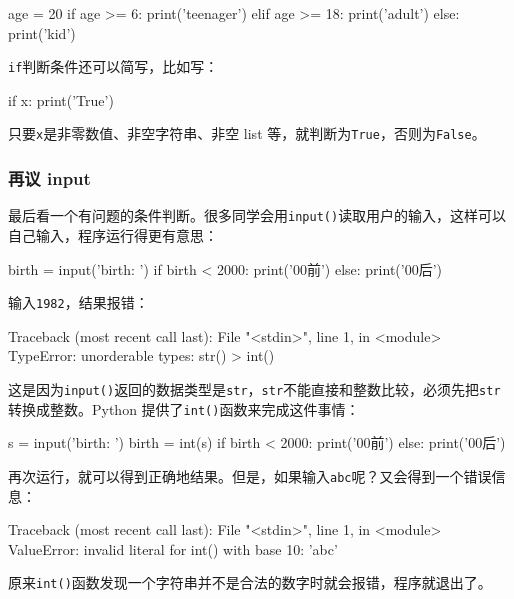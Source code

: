 \begin{pythoncode}
age = 20
if age >= 6:
    print('teenager')
elif age >= 18:
    print('adult')
else:
    print('kid')
\end{pythoncode}

\texttt{if}判断条件还可以简写，比如写：

\begin{pythoncode}
if x:
    print('True')
\end{pythoncode}

只要\texttt{x}是非零数值、非空字符串、非空 list
等，就判断为\texttt{True}，否则为\texttt{False}。

\hypertarget{ux518dux8bae-input}{%
\subsubsection{再议 input}\label{ux518dux8bae-input}}

最后看一个有问题的条件判断。很多同学会用\texttt{input()}读取用户的输入，这样可以自己输入，程序运行得更有意思：

\begin{pythoncode}
birth = input('birth: ')
if birth < 2000:
    print('00前')
else:
    print('00后')
\end{pythoncode}

输入\texttt{1982}，结果报错：

\begin{pythoncode}
Traceback (most recent call last):
  File "<stdin>", line 1, in <module>
TypeError: unorderable types: str() > int()
\end{pythoncode}

这是因为\texttt{input()}返回的数据类型是\texttt{str}，\texttt{str}不能直接和整数比较，必须先把\texttt{str}转换成整数。Python
提供了\texttt{int()}函数来完成这件事情：

\begin{pythoncode}
s = input('birth: ')
birth = int(s)
if birth < 2000:
    print('00前')
else:
    print('00后')
\end{pythoncode}

再次运行，就可以得到正确地结果。但是，如果输入\texttt{abc}呢？又会得到一个错误信息：

\begin{pythoncode}
Traceback (most recent call last):
  File "<stdin>", line 1, in <module>
ValueError: invalid literal for int() with base 10: 'abc'
\end{pythoncode}

原来\texttt{int()}函数发现一个字符串并不是合法的数字时就会报错，程序就退出了。


